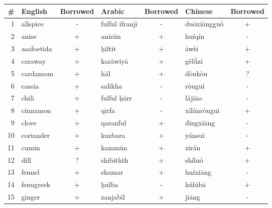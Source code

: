 \begin{table}[ht]
    \begin{tabular}{@{}rlclclc@{}}
    \toprule
    \textbf{\#} & \textbf{English} & \textbf{Borrowed} & \textbf{Arabic}  & \textbf{Borrowed} & \textbf{Chinese} & \textbf{Borrowed} \\ \midrule
    1           & allspice         & -           & fulful ifranjī   & -           & duōxiāngguǒ      & +           \\
    2           & anise            & +           & anīsūn           & +           & huíqín           & -           \\
    3           & asafoetida       & +           & ḥiltīt           & +           & āwèi             & +           \\
    4           & caraway          & +           & karāwiyā         & +           & gělǚzi         & +           \\
    5           & cardamom         & +           & hāl              & +           & dòukòu           & ?           \\
    6           & cassia           & +           & salīkha          & -           & ròuguì           & -           \\
    7           & chili            & +           & fulful ḥārr      & -           & làjiāo           & -           \\
    8           & cinnamon         & +           & qirfa            & -           & xīlánròuguì      & +           \\
    9           & clove            & +           & qaranful         & +           & dīngxiāng        & -           \\
    10          & coriander        & +           & kuzbara          & +           & yánsuī           & -           \\
    11          & cumin            & +           & kammūn           & +           & zīrán            & +           \\
    12          & dill             & ?           & shibithth        & +           & shíluó           & +           \\
    13          & fennel           & +           & shamar           & +           & huíxiāng         & -           \\
    14          & fenugreek        & +           & ḥulba            & -           & húlúbā           & +           \\
    15          & ginger           & +           & zanjabīl         & +           & jiāng            & -           \\

\end{tabular}
\end{table}
